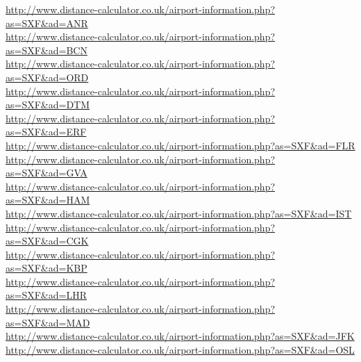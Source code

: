 \url{http://www.distance-calculator.co.uk/airport-information.php?as=SXF&ad=ANR}\\
\url{http://www.distance-calculator.co.uk/airport-information.php?as=SXF&ad=BCN}\\
\url{http://www.distance-calculator.co.uk/airport-information.php?as=SXF&ad=ORD}\\
\url{http://www.distance-calculator.co.uk/airport-information.php?as=SXF&ad=DTM}\\
\url{http://www.distance-calculator.co.uk/airport-information.php?as=SXF&ad=ERF}\\
\url{http://www.distance-calculator.co.uk/airport-information.php?as=SXF&ad=FLR}\\
\url{http://www.distance-calculator.co.uk/airport-information.php?as=SXF&ad=GVA}\\
\url{http://www.distance-calculator.co.uk/airport-information.php?as=SXF&ad=HAM}\\
\url{http://www.distance-calculator.co.uk/airport-information.php?as=SXF&ad=IST}\\
\url{http://www.distance-calculator.co.uk/airport-information.php?as=SXF&ad=CGK}\\
\url{http://www.distance-calculator.co.uk/airport-information.php?as=SXF&ad=KBP}\\
\url{http://www.distance-calculator.co.uk/airport-information.php?as=SXF&ad=LHR}\\
\url{http://www.distance-calculator.co.uk/airport-information.php?as=SXF&ad=MAD}\\
\url{http://www.distance-calculator.co.uk/airport-information.php?as=SXF&ad=JFK}\\
\url{http://www.distance-calculator.co.uk/airport-information.php?as=SXF&ad=OSL}\\
